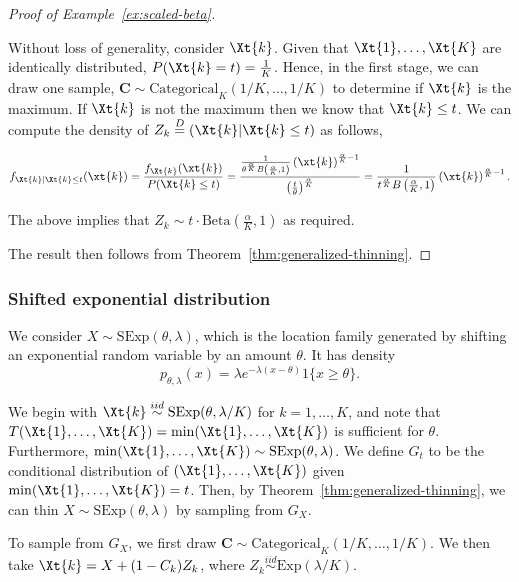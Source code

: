 \documentclass[12pt]{article}
\begin{document}
\begin{proof}[Proof of Example~\ref{ex:scaled-beta}]
\begin{enumerate}
Without loss of generality, consider $\Xt{k}$. Given that $\Xt{1},\dots,\Xt{K}$ are identically distributed, $P(\Xt{k}=t)=\frac{1}{K}$. Hence, in the first stage, we can draw one sample, $\mathbf{C}\sim\text{Categorical}_K(1/K,\dots,1/K)$ to determine if $\Xt{k}$ is the maximum. If $\Xt{k}$ is not the maximum then we know that $\Xt{k} \le t$. We can compute the density of $Z_k\overset{D}{=}(\Xt{k}|\Xt{k}\le t)$ as follows,

$$
f_{\Xt{k}|\Xt{k}\le t}(\xt{k}) = \frac{f_{\Xt{k}}(\xt{k})}{P(\Xt{k}\le t)} =\frac{\frac{1}{\theta^\frac{\alpha}{K} B\left(\frac{\alpha}{K},1\right)} \left(\xt{k}\right)^{\frac{\alpha}{K}-1}}{\left(\frac{t}{\theta}\right)^{\frac{\alpha}{K}}} = \frac{1}{t^\frac{\alpha}{K} B\left(\frac{\alpha}{K},1\right)} \left(\xt{k}\right)^{\frac{\alpha}{K}-1}.
$$

The above implies that $Z_k \sim t\cdot\text{Beta}\left(\frac{\alpha}{K},1\right)$ as required.
    
\end{enumerate}
The result then follows from Theorem~\ref{thm:generalized-thinning}.
\end{proof}

\subsubsection{Shifted exponential distribution}
\label{subsec:shifted-exponential-proofs}

We consider $X\sim \mathrm{SExp}(\theta,\lambda)$, which is the location family generated by shifting an exponential random variable by an amount $\theta$.  It has density
$$
p_{\theta,\lambda}(x)=\lambda e^{-\lambda (x-\theta)}1\{x\ge \theta\}.
$$

\begin{exmp} \label{ex:shifted-exponential}
We begin with $\Xt{k} \overset{iid}{\sim} \mathrm{SExp}(\theta,\lambda/K)$ for $k=1,\ldots,K$, and note that $T(\Xt{1},\dots,\Xt{K})=\min(\Xt{1},\dots,\Xt{K})$ is sufficient for $\theta$.  Furthermore,  $\min(\Xt{1},\dots,\Xt{K})\sim \mathrm{SExp}(\theta,\lambda)$. We define $G_t$ to be the conditional distribution of $(\Xt{1},\ldots,\Xt{K})$ given $  \min(\Xt{1},\dots,\Xt{K})=t$.  Then, by Theorem~\ref{thm:generalized-thinning},   we can thin $X\sim \mathrm{SExp}(\theta,\lambda)$  by sampling from $G_X$.


To sample from $G_X$, we first draw  $\mathbf{C}\sim\text{Categorical}_K\left(1/K,\ldots,1/K \right)$. We then take 
$\Xt{k}=X+(1-C_k)Z_k$,
where  $Z_k\overset{iid}{\sim} \mathrm{Exp}(\lambda/K)$. 

\end{exmp}
\end{document}
